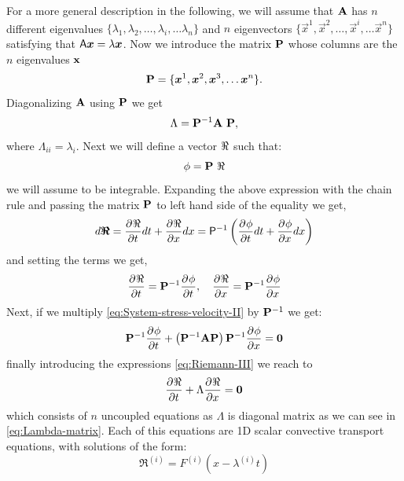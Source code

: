 For a more general description in the following, we will assume that $\mathbf{{A}}$ has $n$
different eigenvalues $\{ \lambda_1, \lambda_2, \ldots, \lambda_i, \ldots
\lambda_n \}$ and $n$ eigenvectors $\{ \vec{x}^1, \vec{x}^2, \ldots,
\vec{x}^i, \ldots \vec{x}^n \}$ satisfying that $\tens{A} \vec{x} =
\lambda \vec{x} $. Now we introduce the matrix $\mathbf{{P}}$ whose columns are the $n$
eigenvalues $\mathbf{{x}}$
\begin{equation}
  \label{eq:P-matrix}
\Matrix{P} = \{ \vec{x}^1, \vec{x}^2, \vec{x}^3, \ldots \vec{x}^n \}.
\end{equation}
Diagonalizing $\mathbf{{A}}$ using $\mathbf{{P}}$ we get
\begin{equation}
  \label{eq:Lambda-matrix}
  \Lambda = \mathbf{{P}}^{-1} \mathbf{{A}}\ \mathbf{{P}},
\end{equation}
where $ \Lambda_{ii} = \lambda_i$. Next we will define a vector $\mathbf{{\Re}}$ such that:
\begin{equation}
  \label{eq:Riemann-definition}
  \mathbf{{\phi}} = \mathbf{{P}}\ \mathbf{{\Re}}
\end{equation}
we will assume to be integrable. Expanding the above expression with
the chain rule and passing the matrix $\mathbf{{P}}$ to left hand side
of the equality we get,
\begin{equation}
  \label{eq:Riemann-II}
  d \vec{\Vector{\Re}} = \Deriv{\Vector{\Re}}{t}dt + \Deriv{\Vector{\Re}}{x}dx =
  \tens{P}^{-1}\left(\Deriv{\phi}{t}dt + \Deriv{\phi}{x}dx \right)
\end{equation}
and setting the terms we get,
\begin{equation}
  \label{eq:Riemann-III}
  \frac{\partial^{}{\mathbf{{\Re}}}}{ \partial {t}^{} } = \mathbf{{P}}^{-1}\frac{\partial^{}{\mathbf{{\phi}}}}{ \partial {t}^{} },\quad 
  \frac{\partial^{}{\mathbf{{\Re}}}}{ \partial {x}^{} } = \mathbf{{P}}^{-1}\frac{\partial^{}{\mathbf{{\phi}}}}{ \partial {x}^{} }
\end{equation}
Next, if we multiply \eqref{eq:System-stress-velocity-II} by
$\mathbf{{P}}^{-1}$ we get:
\begin{equation}
  \label{eq:System-stress-velocity-III}
  \mathbf{{P}}^{-1}\frac{\partial^{}{\mathbf{{\phi}}}}{ \partial {t}^{} } + \left(\mathbf{{P}}^{-1}\mathbf{{A}}\mathbf{{P}}
  \right)\mathbf{{P}}^{-1} \frac{\partial^{}{\mathbf{{\phi}}}}{ \partial {x}^{} } = \mathbf{{0}}
\end{equation}
finally introducing the expressions \eqref{eq:Riemann-III} we reach to
\begin{equation}
  \label{eq:System-stress-velocity-IV}
  \frac{\partial^{}{\mathbf{{\Re}}}}{ \partial {t}^{} } + \Lambda \frac{\partial^{}{\mathbf{{\Re}}}}{ \partial {x}^{} } = \mathbf{{0}}  
\end{equation}
which consists of $n$ uncoupled equations as $\Lambda$ is
diagonal matrix as we can see in \eqref{eq:Lambda-matrix}. Each of this
equations are 1D scalar convective transport equations, with solutions
of the form:
\begin{equation}
  \label{eq:SystemEquations_sigma_v_VI}
  \Re^{(i)} = F^{(i)} \left(x - \lambda^{(i)} t \right)
\end{equation}

